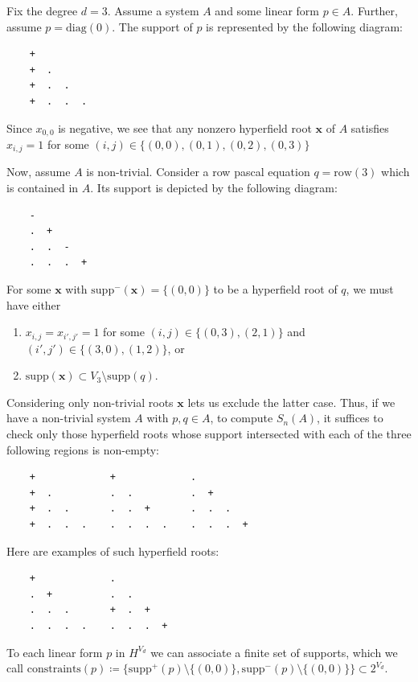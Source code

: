 \begin{example}
Fix the degree $d = 3$.
Assume a system $A$ and some linear form $p \in A$. Further, assume $p = \mathrm{diag}(0)$. The support of $p$ is represented by the following diagram:
\begin{verbatim}
    + 
    +  . 
    +  .  .
    +  .  .  .
\end{verbatim} 
Since $x_{0,0}$ is negative, we see that any nonzero hyperfield root $\mathbf{x}$ of $A$ satisfies $x_{i,j} = 1$ for some \( (i,j) \in \{ (0,0), (0,1), (0,2), (0,3) \} \)


Now, assume $A$ is non-trivial. Consider a row pascal equation $q = \mathrm{row}(3)$ which is contained in \( A \). Its support is depicted by the following diagram:
\begin{verbatim}
    - 
    .  + 
    .  .  -
    .  .  .  +
\end{verbatim} 
For some $\mathbf{x}$ with $\mathrm{supp}^-(\mathbf{x}) = \{ (0,0) \}$ to be a hyperfield root of $q$, we must have either
\begin{enumerate}
\item $x_{i,j} = x_{i',j'} = 1$ for some $(i,j) \in \{ (0,3), (2, 1) \}$ and $(i',j') \in \{ (3,0), (1,2) \}$, or 
\item $\mathrm{supp}(\mathbf{x}) \subset V_{3} \setminus \mathrm{supp}(q)$.
\end{enumerate}
Considering only non-trivial roots $\mathbf{x}$ lets us exclude the latter case. Thus, if we have a non-trivial system $A$ with $p,q \in A$, to compute $S_{n}(A)$, it suffices to check only those hyperfield roots whose support intersected with each of the three following regions is non-empty:
\begin{verbatim}
    +             +             .
    +  .          .  .          .  + 
    +  .  .       .  .  +       .  .  .
    +  .  .  .    .  .  .  .    .  .  .  + 
\end{verbatim}
Here are examples of such hyperfield roots:
\begin{verbatim}
    +             .        
    .  +          .  .      
    .  .  .       +  .  +
    .  .  .  .    .  .  .  +
\end{verbatim}
\end{example}

\begin{definition}
To each linear form $p$ in \( H^{V_d} \) we can associate a finite set of supports, which we call $\mathrm{constraints}(p) \coloneqq \{\mathrm{supp}^+(p) \setminus \{(0,0)\}, \mathrm{supp}^-(p) \setminus \{ (0,0) \} \}  \subset 2^{V_{d}}$. 
\end{definition}

